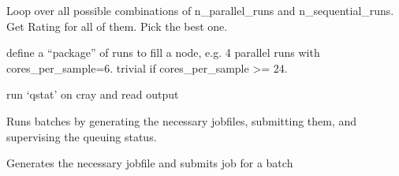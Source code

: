 \documentclass[letterpaper,10pt,english]{sphinxmanual}
\begin{document}
\begin{fulllineitems}
\begin{fulllineitems}
\label{\detokenize{machine:machine.cray.Cray.get_best_option}}
Loop over all possible combinations of n\_parallel\_runs and 
n\_sequential\_runs.
Get Rating for all of them. Pick the best one.

\end{fulllineitems}


\begin{fulllineitems}
\label{\detokenize{machine:machine.cray.Cray.get_package_properties}}
define a “package” of runs to fill a node, 
e.g. 4 parallel runs with cores\_per\_sample=6.
trivial if cores\_per\_sample \textgreater{}= 24.

\end{fulllineitems}


\begin{fulllineitems}
\label{\detokenize{machine:machine.cray.Cray.read_qstat}}
run ‘qstat’ on cray and read output

\end{fulllineitems}


\begin{fulllineitems}
\label{\detokenize{machine:machine.cray.Cray.run_batches}}
Runs batches by generating the necessary jobfiles,
submitting them, and supervising the queuing status.

\end{fulllineitems}


\begin{fulllineitems}
\label{\detokenize{machine:machine.cray.Cray.submit_job}}
Generates the necessary jobfile and submits job for a batch


\end{fulllineitems}
\end{fulllineitems}
\end{document}
